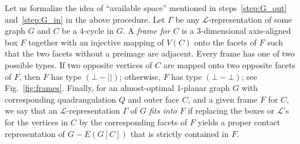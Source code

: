 \documentclass{article}
\newcommand{\df}{\textit}
\newcommand{\LL}{$\mathcal{L}$\xspace}
\newcommand{\pperp}{\ensuremath{(\bot{-}\bot)}}
\newcommand{\ppar}{\ensuremath{(\bot{-}||)}}
\begin{document}
\begin{comment}
\begin{figure}[h!]
 \begin{enumerate}
  \item Find all separating $4$-cycles in the quadrangulation $Q$ of $G$.
  \item If \textbf{(Case 1)} some inner vertex $w$ of $Q$ is adjacent to two outer vertices of $Q$ let $\mathcal{C}$ be the set of the two $4$-cycles in $Q$ consisting of $w$ and three outer vertices of $Q$.
  \item Otherwise \textbf{(Case 2)} let $\mathcal{C}$ be the set of all maximal separating $4$-cycles in $Q$.
  \item Consider the optimal 1-planar (multi)graph $G_{out}$ obtained from $G$ by replacing for each $4$-cycle $C \in \mathcal{C}$ all vertices strictly inside $C$ by a single pair of crossing edges; see Fig.~\ref{fig:opt-H1}.\label{step:define_G_out}
  \item Compute an \LL-representation of $G_{out}$ that has ``some space'' at each $4$-cycle $C \in \mathcal{C}$. In Case~2 this is done based on the shelled box-contact representation of $G_{out}$ in Corollary~\ref{cor:goodCase}.\label{step:G_out}
  \item Go through all $4$-cycles $C \in \mathcal{C}$ and consider the almost-optimal 1-planar subgraph $G_{in}(C)$ of $G$ induced by $C$ and all vertices strictly inside $C$; see Fig.~\ref{fig:opt-H2}. Compute an \LL-representation of $G_{in}(C)$ recursively and insert it into the corresponding ``space'' in the \LL-representation of $G_{out}$.\label{step:G_in}
 \end{enumerate}
 \caption{Outline of the procedure constructing an \LL-representation for any given optimal 1-planar graph $G$ in linear time.}
 \label{fig:outline}
\end{figure}
\end{comment}


Let us formalize the idea of ``available space'' mentioned in steps~\ref{step:G_out} and~\ref{step:G_in} in the above procedure.
Let $\Gamma$ be any \LL-representation of some graph $G$ and $C$ be a $4$-cycle in $G$.
A \df{frame for $C$} is a $3$-dimensional axis-aligned box $F$ together with an injective mapping
of $V(C)$ onto the facets of $F$ such that the two facets without a preimage are adjacent.
Every frame has one of two possible types.
If two opposite vertices of $C$ are mapped onto two opposite facets of $F$, then $F$ has type $\ppar$;
otherwise, $F$ has type $\pperp$;  see Fig.~\ref{fig:frames}.
Finally, for an almost-optimal 1-planar graph $G$ with corresponding quadrangulation $Q$ and outer face $C$, and a given frame $F$ for $C$, we say that an \LL-representation $\Gamma$ of $G$ \df{fits into $F$} if replacing the boxes or \LL's for the vertices in $C$ by the corresponding facets of $F$ yields a proper contact representation of $G - E(G[C])$ that is strictly contained in $F$.
\end{document}
